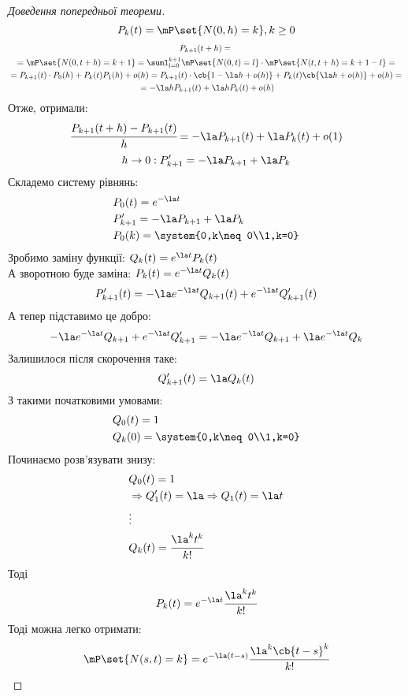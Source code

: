 \begin{proof}[Доведення попередньої теореми]
	\begin{equation}
		P_k(t) = \mP\set{N(0,h)=k},k\geq 0
	\end{equation}
	\begin{multline}
		P_{k+1}(t+h) = {} \\ {} =  \mP\set{N(0,t+h)=k+1} = \suml_{l=0}^{k+1} \mP\set{N(0,t)=l}\cdot \mP\set{N(t,t+h) = k+1-l} = {} \\ {} = P_{k+1}(t)\cdot P_0(h) + P_k(t)P_1(h) + o(h) = P_{k+1}(t)\cdot\cb{1-\la h + o(h)} + P_k(t)\cb{\la h +o(h)} + o(h) ={} \\ {} = -\la h P_{k+1}(t) + \la h P_k(t) + o(h)
	\end{multline}
	Отже, отримали:
	\begin{equation}
		\cfrac{P_{k+1}(t+h)-P_{k+1}(t)}{h} = -\la  P_{k+1}(t) + \la P_k(t) + o(1)
	\end{equation}
	\begin{equation}
		h\to0:P_{k+1}' = -\la P_{k+1} + \la P_k
	\end{equation}
	Складемо систему рівнянь:
	\begin{eqnarray}
		&P_0(t) = e^{-\la t}\\
		&P_{k+1}' = -\la P_{k+1} + \la P_k\\
		&P_0(k) = \system{0,k\neq 0\\1,k=0}
	\end{eqnarray}
	Зробимо заміну функції: $Q_k(t) = e^{\la t} P_k(t)$\\
	А зворотною буде заміна: $P_k(t) = e^{-\la t} Q_k(t)$
	\begin{equation}
		P_{k+1}'(t) = -\la e^{-\la t} Q_{k+1}(t) + e^{-\la t} Q_{k+1}'(t)
	\end{equation}
	А тепер підставимо це добро:
	\begin{equation}
		-\la e^{-\la t} Q_{k+1} + e^{-\la t} Q_{k+1}' = -\la e^{-\la t} Q_{k+1} + \la e^{- \la t} Q_k
	\end{equation}
	Залишилося після скорочення таке:
	\begin{equation}
		Q_{k+1}'(t) = \la Q_k(t)
	\end{equation}
	З такими початковими умовами:
	\begin{eqnarray}
		&Q_0(t) = 1\\
		&Q_k(0) = \system{0,k\neq 0\\1,k=0}
	\end{eqnarray}
	Починаємо розв’язувати знизу:
	\begin{eqnarray}
		&Q_0(t)=1\\
		&\Rightarrow Q_1'(t) = \la \Rightarrow Q_1(t) = \la t \\
		& \vdots\nonumber\\
		&Q_k(t)  = \cfrac{\la^k t^k }{k!}
	\end{eqnarray}
	Тоді
	\begin{equation}
		P_k(t) = e^{-\la t}\cfrac{\la^k t^k }{k!}
	\end{equation}
	Тоді можна легко отримати:
	\begin{equation}
		\mP\set{N(s,t) = k } = e^{-\la (t-s)} \cfrac{\la^k\cb{t-s}^k}{k!}
	\end{equation}
\end{proof}

